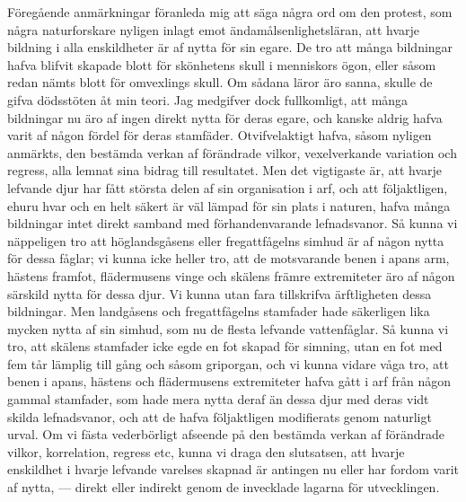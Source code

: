 Föregående anmärkningar föranleda mig att säga några ord om den protest, som några naturforskare nyligen inlagt emot ändamålsenlighetsläran, att hvarje bildning i alla enskildheter är af nytta för sin egare. De tro att många bildningar hafva blifvit skapade blott för skönhetens skull i menniskors ögon, eller såsom redan nämts blott för omvexlings skull. Om sådana läror äro sanna, skulle de gifva dödsstöten åt min teori. Jag medgifver dock fullkomligt, att många bildningar nu äro af ingen direkt nytta för deras egare, och kanske aldrig hafva varit af någon fördel för deras stamfäder. Otvifvelaktigt hafva, såsom nyligen anmärkts, den bestämda verkan af förändrade vilkor, vexelverkande variation och regress, alla lemnat sina bidrag till resultatet. Men det vigtigaste är, att hvarje lefvande djur har fått största delen af sin organisation i arf, och att följaktligen, ehuru hvar och en helt säkert är väl lämpad för sin plats i naturen, hafva många bildningar intet direkt samband med förhandenvarande lefnadsvanor. Så kunna vi näppeligen tro att höglandsgåsens eller fregattfågelns simhud är af någon nytta för dessa fåglar; vi kunna icke heller tro, att de motsvarande benen i apans arm, hästens framfot, flädermusens vinge och skälens främre extremiteter äro af någon särskild nytta för dessa djur. Vi kunna utan fara tillskrifva ärftligheten dessa bildningar. Men landgåsens och fregattfågelns stamfader hade säkerligen lika mycken nytta af sin simhud, som nu de flesta lefvande vattenfåglar. Så kunna vi tro, att skälens stamfader icke egde en fot skapad för simning, utan en fot med fem tår lämplig till gång och såsom griporgan, och vi kunna vidare våga tro, att benen i apans, hästens och flädermusens extremiteter hafva gått i arf från någon gammal stamfader, som hade mera nytta deraf än dessa djur med deras vidt skilda lefnadsvanor, och att de hafva följaktligen modifierats genom naturligt urval. Om vi fästa vederbörligt afseende på den bestämda verkan af förändrade vilkor, korrelation, regress etc, kunna vi draga den slutsatsen, att hvarje enskildhet i hvarje lefvande varelses skapnad är antingen nu eller har fordom varit af nytta, — direkt eller indirekt genom de invecklade lagarna för utvecklingen.

